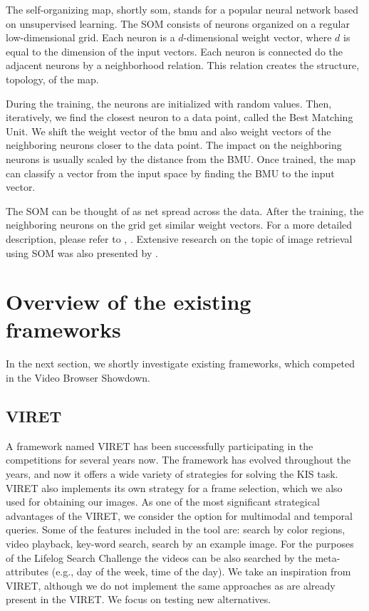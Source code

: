 The self-organizing map, shortly \acrshort{som}, stands for a popular neural network based on unsupervised learning. The SOM consists of neurons organized on a regular low-dimensional grid. Each neuron is a $d$-dimensional weight vector, where $d$ is equal to the dimension of the input vectors. Each neuron is connected do the adjacent neurons by a neighborhood relation. This relation creates the structure, topology, of the map. 

During the training, the neurons are initialized with random values. Then, iteratively, we find the closest neuron to a data point, called the Best Matching Unit. We shift the weight vector of the \acrshort{bmu} and also weight vectors of the neighboring neurons closer to the data point. The impact on the neighboring neurons is usually scaled by the distance from the BMU. Once trained, the map can classify a vector from the input space by finding the BMU to the input vector.

The SOM can be thought of as net spread across the data. After the training, the neighboring neurons on the grid get similar weight vectors. For a more detailed description, please refer to \cite{kohonen1982self}, \cite{kohonen2007kohonen}. Extensive research on the topic of image retrieval using SOM was also presented by \cite{koskela2003interactive}.

\section{Overview of the existing frameworks}

In the next section, we shortly investigate existing frameworks, which competed in the Video Browser Showdown.

\subsection{VIRET}

A framework named VIRET \citep{lokovc2019framework, lokovc2019viret} has been successfully participating in the competitions for several years now. The framework has evolved throughout the years, and now it offers a wide variety of strategies for solving the KIS task. VIRET also implements its own strategy for a frame selection, which we also used for obtaining our images. As one of the most significant strategical advantages of the VIRET, we consider the option for multimodal and temporal queries. Some of the features included in the tool are: search by color regions, video playback, key-word search, search by an example image. For the purposes of the Lifelog Search Challenge \citep{LSC20} the videos can be also searched by the meta-attributes (e.g., day of the week, time of the day). We take an inspiration from VIRET, although we do not implement the same approaches as are already present in the VIRET. We focus on testing new alternatives.

